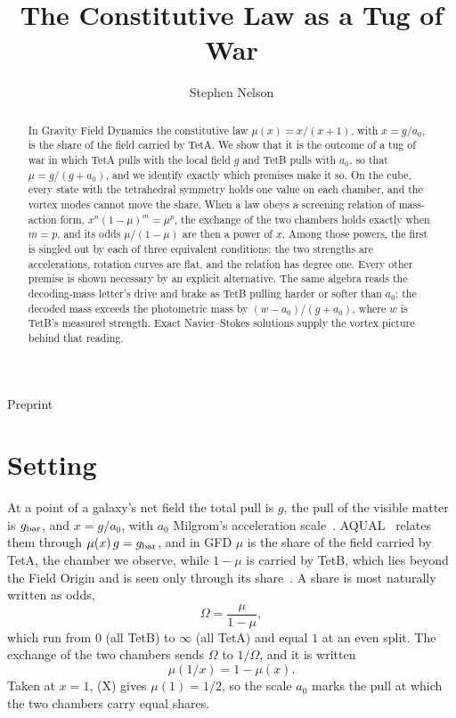 \documentclass[twocolumn]{iopjournal}
\renewcommand{\articletype}[1]{%
  {\vspace*{-8mm}\noindent \Large \sf Preprint}\par
  \vspace*{6mm}\noindent{\scriptsize \sf{\bfseries \MakeUppercase{#1}}}}
\theoremstyle{definition}
\theoremstyle{remark}
\begin{document}
\articletype{Proof}

\title{The Constitutive Law as a Tug of War}

\author{Stephen Nelson}



\begin{abstract}
In Gravity Field Dynamics the constitutive law $\mu(x) = x/(x+1)$, with
$x = g/a_0$, is the share of the field carried by TetA. We show that it is
the outcome of a tug of war in which TetA pulls with the local field $g$
and TetB pulls with $a_0$, so that $\mu = g/(g+a_0)$, and we identify
exactly which premises make it so. On the cube, every state with the
tetrahedral symmetry holds one value on each chamber, and the vortex modes
cannot move the share. When a law obeys a screening relation of
mass-action form, $x^n(1-\mu)^m = \mu^p$, the exchange of the two chambers
holds exactly when $m = p$, and its odds $\mu/(1-\mu)$ are then a power of
$x$. Among those powers, the first is singled out by each of three
equivalent conditions: the two strengths are accelerations, rotation
curves are flat, and the relation has degree one. Every other premise is
shown necessary by an explicit alternative. The same algebra reads the
decoding-mass letter's drive and brake as TetB pulling harder or softer
than $a_0$: the decoded mass exceeds the photometric mass by
$(w - a_0)/(g + a_0)$, where $w$ is TetB's measured strength. Exact
Navier--Stokes solutions supply the vortex picture behind that reading.
\end{abstract}



\section*{Setting}

At a point of a galaxy's net field the total pull is $g$, the pull of the
visible matter is $g_{\rm bar}$, and $x = g/a_0$, with $a_0$ Milgrom's
acceleration scale~\cite{Milgrom1983}. AQUAL~\cite{BM1984}
relates them through $\mu(x)\,g = g_{\rm bar}$, and in GFD $\mu$ is the
share of the field carried by TetA, the chamber we observe, while $1 - \mu$
is carried by TetB, which lies beyond the Field Origin and is seen only
through its share~\cite{NelsonL2,NelsonL3}. A share is most naturally
written as odds,
\begin{equation}
  \Omega = \frac{\mu}{1-\mu},
\end{equation}
which run from $0$ (all TetB) to $\infty$ (all TetA) and equal $1$ at an
even split. The exchange of the two chambers sends $\Omega$ to $1/\Omega$,
and it is written
\begin{equation}
  \mu(1/x) = 1 - \mu(x). \tag{X}
\end{equation}
Taken at $x = 1$, (X) gives $\mu(1) = 1/2$, so the scale $a_0$ marks the
pull at which the two chambers carry equal shares.
\end{document}
